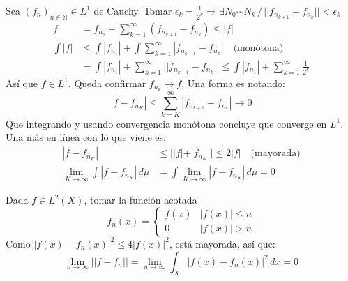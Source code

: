 \documentclass{book}
\begin{document}
\begin{teorema}[$L^1$ es completo]
    Sea $(f_n)_{n\in\mathbb{N}} \in L^1$ de Cauchy. Tomar $\epsilon_k = \frac{1}{2^k} \Rightarrow \exists N_0 \cdots N_k \,/\, || f_{n_{k+1}} - f_{n_k} || < \epsilon_k$
    \begin{align*}
        f &= f_{n_1} + \sum_{k=1}^{\infty}(f_{n_{k+1}} - f_{n_k}) \leq |f|\\
        \int |f| &\leq \int |f_{n_1}| + \int \sum_{k=1}^{\infty}|f_{n_{k+1}} - f_{n_k}| \quad\text{(mon\'otona)}\\
                 &= \int |f_{n_1}| + \sum_{k=1}^{\infty} ||f_{n_{k+1}} - f_{n_k}|| \leq \int |f_{n_1}| + \sum_{k=1}^{\infty} \frac{1}{2^k}
    \end{align*}
    As\'i que $f \in L^1$. Queda confirmar $f_{n_k} \to f$. Una forma es notando:
        $$|f - f_{n_K}| \leq \sum_{k=K}^{\infty}|f_{n_{k+1}} - f_{n_k}| \to 0$$
    Que integrando y usando convergencia mon\'otona concluye que converge en $L^1$. Una m\'as en l\'inea con lo que viene es:
    \begin{align*}
        |f - f_{n_K}| &\leq ||f| + |f_{n_K}|| \leq 2|f| \quad \text{(mayorada)}\\
        \lim_{K\to\infty}\int|f - f_{n_K}|\, d\mu &= \int\lim_{K\to\infty}|f - f_{n_K}|\, d\mu = 0
    \end{align*}
\end{teorema}
\begin{teorema}
\end{teorema}
\begin{teorema}[$B(X)$ es denso en $L^2(X)$]
    Dada $f \in L^2(X)$, tomar la funci\'on acotada
    $$f_n(x) =
    \begin{cases}
        f(x)    & |f(x)| \leq n\\
        0       & |f(x)| > n
    \end{cases}
    $$
    Como $|f(x) - f_n(x)|^2 \leq 4|f(x)|^2$, est\'a mayorada, as\'i que:
    $$
    \lim_{n\to\infty}||f - f_n|| = \lim_{n\to\infty} \int_X |f(x) - f_n(x)|^2\,dx = 0
    $$
\end{teorema}
\end{document}
